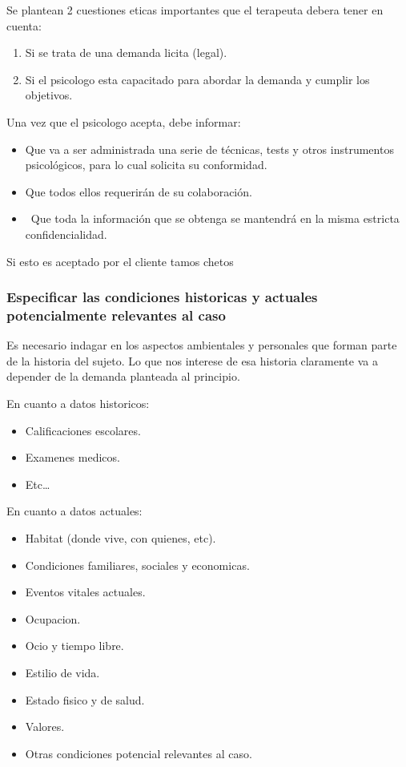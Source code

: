 \documentclass[12pt,a4paper]{article}
\begin{document}
Se plantean 2 cuestiones eticas importantes que el terapeuta debera tener en cuenta:

\begin{enumerate}
	\item Si se trata de una demanda licita (legal).
	\item Si el psicologo esta capacitado para abordar la demanda y cumplir los objetivos. 
\end{enumerate}


Una vez que el psicologo acepta, debe informar:

\begin{itemize}
	\item Que va a ser administrada una serie de técnicas, tests y otros instrumentos psicológicos, para lo cual solicita su conformidad.
	\item Que todos ellos requerirán de su colaboración.
	\item  Que toda la información que se obtenga se mantendrá en la misma estricta confidencialidad.
\end{itemize}

Si esto es aceptado por el cliente tamos chetos

\subsubsection{Especificar las condiciones historicas y actuales potencialmente relevantes al caso}%

Es necesario indagar en los aspectos ambientales y personales que forman parte de la historia del sujeto. Lo que nos interese de esa historia claramente va a depender de la demanda planteada al principio. 

En cuanto a datos historicos:
\begin{itemize}
	\item Calificaciones escolares.
	\item Examenes medicos.
	\item Etc\ldots
\end{itemize}

En cuanto a datos actuales:
\begin{itemize}
	\item Habitat (donde vive, con quienes, etc).
	\item Condiciones familiares, sociales y economicas.
	\item Eventos vitales actuales.
	\item Ocupacion.
	\item Ocio y tiempo libre.
	\item Estilio de vida.
	\item Estado fisico y de salud.
	\item Valores.
	\item Otras condiciones potencial relevantes al caso. 
\end{itemize}
\end{document}
